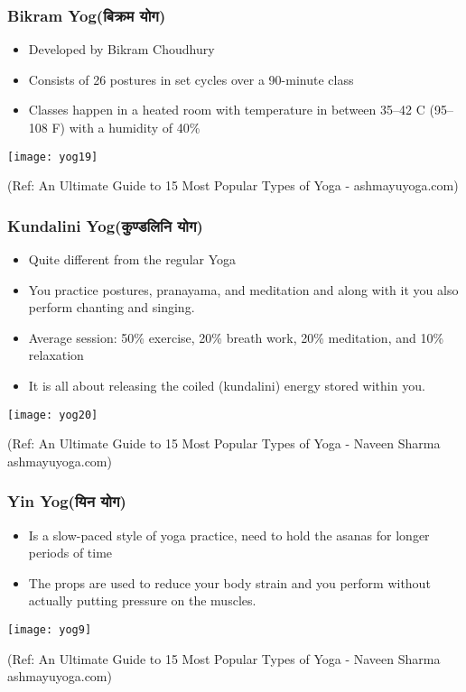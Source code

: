 \begin{frame}[fragile]\frametitle{Bikram Yog(बिक्रम योग)}
	\begin{itemize}
	\item Developed by Bikram Choudhury
	\item Consists of 26 postures in set cycles over a 90-minute class
	\item Classes happen in a heated room with temperature in between 35–42 C (95–108 F) with a humidity of 40\%
	\end{itemize}

\begin{center}
\texttt{[image: yog19]}

\tiny{(Ref: An Ultimate Guide to 15 Most Popular Types of Yoga - ashmayuyoga.com)}
\end{center}

\end{frame}

\begin{frame}[fragile]\frametitle{Kundalini Yog(कुण्डलिनि योग)}
	\begin{itemize}
	\item Quite different from the regular Yoga
	\item You practice postures, pranayama, and meditation and along with it you also perform chanting and singing. 
	\item Average session: 50\% exercise, 20\% breath work, 20\% meditation, and 10\% relaxation
	\item It is all about releasing the coiled (kundalini) energy stored within you.
	\end{itemize}

\begin{center}
\texttt{[image: yog20]}

\tiny{(Ref: An Ultimate Guide to 15 Most Popular Types of Yoga - Naveen Sharma ashmayuyoga.com)}
\end{center}

\end{frame}

\begin{frame}[fragile]\frametitle{Yin Yog(यिन योग)}
	\begin{itemize}
	\item Is a slow-paced style of yoga practice, need to hold the asanas for longer periods of time
	\item The props are used to reduce your body strain and you perform without actually putting pressure on the muscles.
	\end{itemize}

\begin{center}
\texttt{[image: yog9]}

\tiny{(Ref: An Ultimate Guide to 15 Most Popular Types of Yoga - Naveen Sharma ashmayuyoga.com)}
\end{center}

\end{frame}


